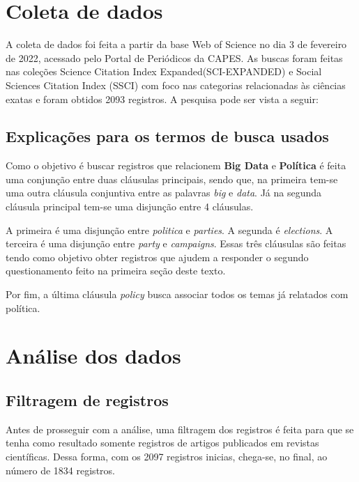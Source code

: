 \section{Coleta de dados\label{BDP:coleta}}
A coleta de dados foi feita a partir da base Web of Science no dia 3 de fevereiro de 2022, acessado pelo Portal de Periódicos da CAPES. As buscas foram feitas nas coleções Science Citation Index Expanded(SCI-EXPANDED) e Social Sciences Citation Index (SSCI) com foco nas categorias relacionadas às ciências exatas e foram obtidos 2093 registros. A pesquisa pode ser vista a seguir:



\subsection{Explicações para os termos de busca usados\label{BDP:query}}
Como o objetivo é buscar registros que relacionem \textbf{Big Data} e \textbf{Política} é feita uma conjunção entre duas cláusulas principais, sendo que, na primeira tem-se uma outra cláusula conjuntiva entre as palavras \textit{big} e \textit{data}. Já na segunda cláusula principal tem-se uma disjunção entre 4 cláusulas.

A primeira é uma disjunção entre \textit{politica} e \textit{parties}. A segunda é \textit{elections}. A terceira é uma disjunção entre \textit{party} e \textit{campaigns}. Essas três cláusulas são feitas tendo como objetivo obter registros que ajudem a responder o segundo questionamento feito na primeira seção deste texto.

Por fim, a última cláusula \textit{policy} busca associar todos os temas já relatados com política.

\section{Análise dos dados}

\subsection{Filtragem de registros}
Antes de prosseguir com a análise, uma filtragem dos registros é feita para que se tenha como resultado somente registros de artigos publicados em revistas científicas. Dessa forma, com os 2097 registros inicias, chega-se, no final, ao número de 1834 registros.

